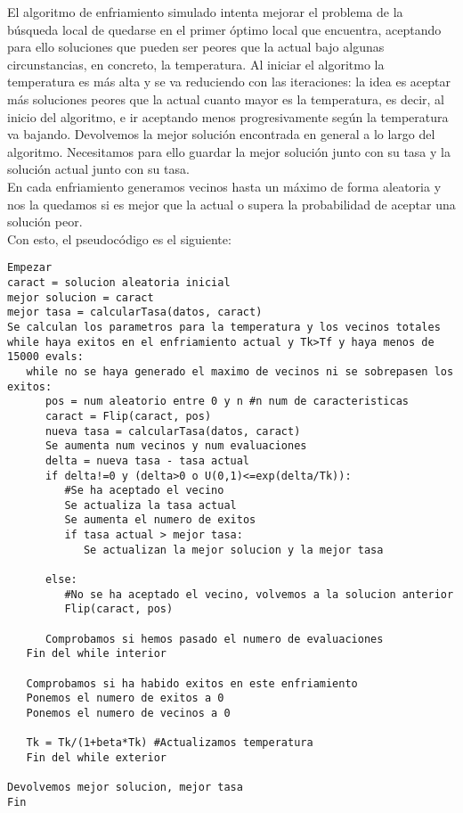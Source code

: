 \documentclass[12pt]{article}
\begin{document}
El algoritmo de enfriamiento simulado intenta mejorar el problema de la búsqueda local de quedarse en el primer óptimo local que encuentra, aceptando para ello soluciones que pueden ser peores que la actual bajo algunas circunstancias, en concreto, la temperatura. Al iniciar el algoritmo la temperatura es más alta y se va reduciendo con las iteraciones: la idea es aceptar más soluciones peores que la actual cuanto mayor es la temperatura, es decir, al inicio del algoritmo, e ir aceptando menos progresivamente según la temperatura va bajando. Devolvemos la mejor solución encontrada en general a lo largo del algoritmo. Necesitamos para ello guardar la mejor solución junto con su tasa y la solución actual junto con su tasa.\\
En cada enfriamiento generamos vecinos hasta un máximo de forma aleatoria y nos la quedamos si es mejor que la actual o supera la probabilidad de aceptar una solución peor.\\

Con esto, el pseudocódigo es el siguiente:
\begin{lstlisting}
Empezar
caract = solucion aleatoria inicial
mejor solucion = caract
mejor tasa = calcularTasa(datos, caract)
Se calculan los parametros para la temperatura y los vecinos totales
while haya exitos en el enfriamiento actual y Tk>Tf y haya menos de 15000 evals:
   while no se haya generado el maximo de vecinos ni se sobrepasen los exitos:
      pos = num aleatorio entre 0 y n #n num de caracteristicas
      caract = Flip(caract, pos)
      nueva tasa = calcularTasa(datos, caract)
      Se aumenta num vecinos y num evaluaciones
      delta = nueva tasa - tasa actual
      if delta!=0 y (delta>0 o U(0,1)<=exp(delta/Tk)):
         #Se ha aceptado el vecino
         Se actualiza la tasa actual
         Se aumenta el numero de exitos
         if tasa actual > mejor tasa:
            Se actualizan la mejor solucion y la mejor tasa
      
      else:
         #No se ha aceptado el vecino, volvemos a la solucion anterior
         Flip(caract, pos)
         
      Comprobamos si hemos pasado el numero de evaluaciones
   Fin del while interior
   
   Comprobamos si ha habido exitos en este enfriamiento
   Ponemos el numero de exitos a 0
   Ponemos el numero de vecinos a 0
      
   Tk = Tk/(1+beta*Tk) #Actualizamos temperatura
   Fin del while exterior
      
Devolvemos mejor solucion, mejor tasa
Fin
\end{lstlisting}
\end{document}
